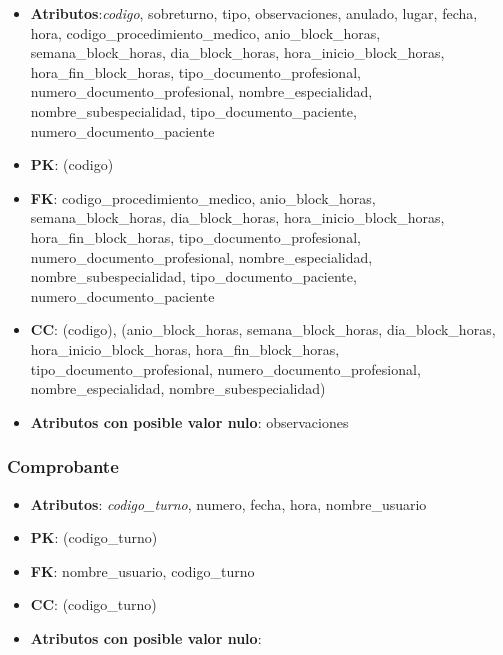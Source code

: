 \documentclass[a4paper,11pt]{article}
\begin{document}
\begin{itemize}

\item 
\textbf{Atributos}:\emph{codigo}, sobreturno, tipo, observaciones, anulado, lugar, fecha, hora,  codigo\_procedimiento\_medico, 
anio\_block\_horas, semana\_block\_horas, dia\_block\_horas, hora\_inicio\_block\_horas, hora\_fin\_block\_horas,
tipo\_documento\_profesional, numero\_documento\_profesional, nombre\_especialidad, 
nombre\_subespecialidad, tipo\_documento\_paciente, numero\_documento\_paciente

\item 
\textbf{PK}: (codigo)

\item
\textbf{FK}: codigo\_procedimiento\_medico, 
anio\_block\_horas, semana\_block\_horas, dia\_block\_horas, hora\_inicio\_block\_horas, hora\_fin\_block\_horas,
tipo\_documento\_profesional, numero\_documento\_profesional, nombre\_especialidad,
nombre\_subespecialidad, tipo\_documento\_paciente, numero\_documento\_paciente

\item 
\textbf{CC}: (codigo), 
(anio\_block\_horas, semana\_block\_horas, dia\_block\_horas, hora\_inicio\_block\_horas, hora\_fin\_block\_horas,
tipo\_documento\_profesional, numero\_documento\_profesional, nombre\_especialidad, 
nombre\_subespecialidad)

\item 
\textbf{Atributos con posible valor nulo}: observaciones

\end{itemize}
\subsubsection{\textbf{Comprobante}}

\begin{itemize}

\item 
\textbf{Atributos}: \emph{codigo\_turno}, numero, fecha, hora, nombre\_usuario

\item 
\textbf{PK}: (codigo\_turno)

\item
\textbf{FK}:  nombre\_usuario, codigo\_turno

\item 
\textbf{CC}: (codigo\_turno)

\item 
\textbf{Atributos con posible valor nulo}: 

\end{itemize}
\end{document}

